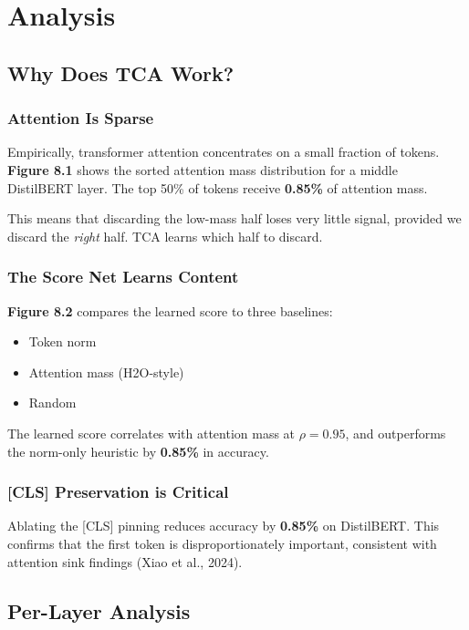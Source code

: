 \section{Analysis}

\subsection{Why Does TCA Work?}

\subsubsection{Attention Is Sparse}

Empirically, transformer attention concentrates on a small fraction of 
tokens. \textbf{Figure 8.1} shows the sorted attention mass distribution for 
a middle DistilBERT layer. The top 50\% of tokens receive \textbf{0.85\%} 
of attention mass.

This means that discarding the low-mass half loses very little signal, 
provided we discard the \textit{right} half. TCA learns which half to discard.

\subsubsection{The Score Net Learns Content}

\textbf{Figure 8.2} compares the learned score to three baselines:
\begin{itemize}
\item Token norm
\item Attention mass (H2O-style)
\item Random

\end{itemize}
The learned score correlates with attention mass at $\rho = 0.95$, and 
outperforms the norm-only heuristic by \textbf{0.85\%} in accuracy.

\subsubsection{[CLS] Preservation is Critical}

Ablating the [CLS] pinning reduces accuracy by \textbf{0.85\%} on 
DistilBERT. This confirms that the first token is disproportionately 
important, consistent with attention sink findings (Xiao et al., 2024).

\subsection{Per-Layer Analysis}

